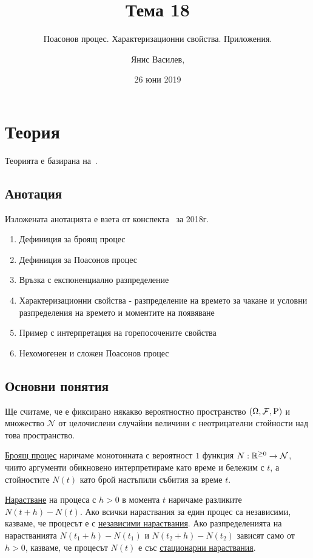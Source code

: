 \documentclass[numbers=endperiod, DIV=15, bibliography=totocnumbered]{scrartcl}
\title{Тема 18}
\subtitle{Поасонов процес. Характеризационни свойства. Приложения.}
\author{Янис Василев, \Email{ianis@ivasilev.net}}
\date{26 юни 2019}
\begin{document}
\maketitle

\section{Теория}

Теорията е базирана на~\cite{Lectures}.

\subsection{Анотация}

Изложената анотацията е взета от конспекта~\cite{Syllabus} за 2018г.

\begin{enumerate}
  \item Дефиниция за броящ процес
  \item Дефиниция за Поасонов процес
  \item Връзка с експоненциално разпределение
  \item Характеризационни свойства - разпределение на времето за чакане и условни разпределения на времето и моментите на появяване
  \item Пример с интерпретация на горепосочените свойства
  \item Нехомогенен и сложен Поасонов процес
\end{enumerate}

\subsection{Основни понятия}

Ще считаме, че е фиксирано някакво вероятностно пространство $(\Omega, \mathcal{F}, \operatorname{P})$ и множество $\mathcal{N}$ от целочислени случайни величини с неотрицателни стойности над това пространство.

\begin{definition}
  \uline{Броящ процес} наричаме монотонната с вероятност $1$ функция $N: \mathbb{R}^{\geq 0} \to \mathcal{N}$, чиито аргументи обикновено интерпретираме като време и бележим с $t$, а стойностите $N(t)$ като брой настъпили събития за време $t$.

  \uline{Нарастване} на процеса с $h > 0$ в момента $t$ наричаме разликите $N(t+h) - N(t)$. Ако всички нараствания за един процес са независими, казваме, че процесът е с \uline{независими нараствания}. Ако разпределенията на нарастванията $N(t_1+h) - N(t_1)$ и $N(t_2+h) - N(t_2)$ зависят само от $h>0$, казваме, че процесът $N(t)$ е със \uline{стационарни нараствания}.
\end{definition}
\end{document}
